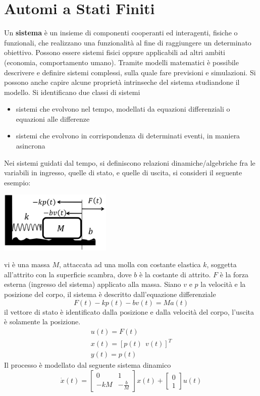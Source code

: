 \documentclass[10pt, letterpaper]{report}
\begin{document}
\section{Automi a Stati Finiti}
 Un \textbf{sistema} è un insieme di componenti cooperanti ed interagenti, fisiche o funzionali, che realizzano una funzionalità al fine di raggiungere un determinato obiettivo. Possono essere sistemi fisici oppure applicabili ad altri ambiti (economia, comportamento umano).\acc 
Tramite modelli matematici è possibile descrivere e definire sistemi complessi, sulla quale fare previsioni e simulazioni. Si possono anche  capire alcune proprietà intrinseche del sistema studiandone il modello. Si identificano due classi di sistemi\begin{itemize}
    \item sistemi che evolvono nel tempo, modellati da equazioni differenziali o equazioni alle differenze 
    \item sistemi che evolvono in corrispondenza di determinati eventi, in maniera asincrona
\end{itemize}
Nei sistemi guidati dal tempo, si definiscono relazioni dinamiche/algebriche fra le variabili in ingresso, quelle di stato, e quelle di uscita, si consideri il seguente esempio:
\begin{center}
    \includegraphics[width=0.4\textwidth]{images/mollaMassa.pdf}
\end{center}
vi è una massa $M$, attaccata ad una molla con costante elastica $k$, soggetta all'attrito con la superficie scambra, dove $b$ è la costante di attrito. $F$ è la forza esterna (ingresso del sistema) applicato alla massa. Siano $v$ e $p$ la velocità e la posizione del corpo, il sistema è descritto dall'equazione differenziale 
$$ F(t)-kp(t)-bv(t)=Ma(t)$$
il vettore di stato è identificato dalla posizione e dalla velocità del corpo, l'uscita è solamente la posizione. 
$$ \begin{matrix}
    u(t)=F(t)\\ 
    x(t)=[p(t) \ \ v(t)]^T\\ 
    y(t)=p(t)
\end{matrix}$$
Il processo è modellato dal seguente sistema dinamico 
$$\dot{x}(t)=\begin{bmatrix}
    0 & 1 \\ 
    -kM & -\frac{b}{M}
\end{bmatrix}x(t)+\begin{bmatrix}
    0\\ 1
\end{bmatrix}u(t) $$
\end{document}
